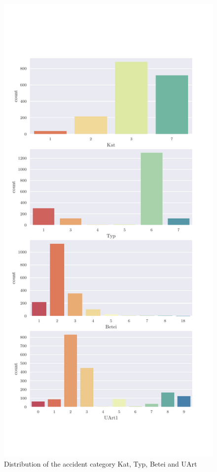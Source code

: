     \begin{figure}[ht!]
        \centering
        \includegraphics[scale=0.7]{code/data/BAYSIS/02_matched/plots/baysis_matched_count_multiple01}
        \caption{Distribution of the accident category Kat, Typ, Betei and UArt}
        \label{img:baysis_matched_Kat}
        \label{img:baysis_matched_Typ}
        \label{img:baysis_matched_Betei}
        \label{img:baysis_matched_UArt}
    \end{figure}

